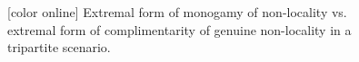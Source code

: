 \documentclass[%
 reprint,
 amsmath,amssymb,
 aps,
]{revtex4-1}
\theoremstyle{plain}
\begin{document}
\begin{figure}
\hspace{0.08\linewidth}
\caption{\label{idea}[color online] Extremal form of monogamy of non-locality vs. extremal form of complimentarity of genuine non-locality in a tripartite scenario.}

\end{figure}
\end{document}
